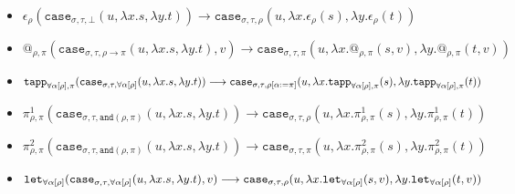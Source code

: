 \documentclass[runningheads,a4paper]{llncs}
\newcommand{\quant}[2]{\forall #1[#2]}
\newcommand{\qquant}[3]{#1 #2[#3]}
\newcommand{\red}{\longrightarrow}
\newcommand{\arrtype}{\rightarrow}
\newcommand{\abs}[2]{\lambda #1.#2}
\begin{document}
\begin{itemize}
\item $
\epsilon_\rho(\mathtt{case}_{\sigma,\tau,\bot}(u,\abs{x}{s},\abs{y}{t}))
  \red
  \mathtt{case}_{\sigma,\tau,\rho}(u,\abs{x}{\epsilon_\rho(s)},
  \abs{y}{\epsilon_\rho(t)}) $%
\item $
@_{\rho,\pi}(\mathtt{case}_{\sigma,\tau,\rho \arrtype \pi}(u,
  \abs{x}{s},\abs{y}{t}),v) %
  \red
  \mathtt{case}_{\sigma,\tau,\pi}(u,
  \abs{x}{@_{\rho,\pi}(s,v)},\abs{y}{@_{\rho,\pi}(t,v)}) $%
\item $
\mathtt{tapp}_{\quant{\alpha}{\rho},\pi}(\mathtt{case}_{\sigma,\tau,
  \quant{\alpha}{\rho}}(u,\abs{x}{s},\abs{y}{t})) %
  \red
  \mathtt{case}_{\sigma,\tau,\rho[\alpha:=\pi]}(u,
  \abs{x}{\mathtt{tapp}_{\quant{\alpha}{\rho},\pi}(s)},\\
  \abs{y}{\mathtt{tapp}_{\quant{\alpha}{\rho},\pi}(t)}) $%
\item $
\pi^1_{\rho,\pi}(\mathtt{case}_{\sigma,\tau,\mathtt{and}(\rho,\pi)}(u,
  \abs{x}{s},\abs{y}{t})) %
  \red
  \mathtt{case}_{\sigma,\tau,\rho}(u,\abs{x}{\pi^1_{\rho,\pi}(s)},
  \abs{y}{\pi^1_{\rho,\pi}(t)}) $%
\item $
\pi^2_{\rho,\pi}(\mathtt{case}_{\sigma,\tau,\mathtt{and}(\rho,\pi)}(u,
  \abs{x}{s},\abs{y}{t})) %
  \red
  \mathtt{case}_{\sigma,\tau,\pi}(u,\abs{x}{\pi^2_{\rho,\pi}(s)},
  \abs{y}{\pi^2_{\rho,\pi}(t)}) $%
\item $
\mathtt{let}_{\qquant{\forall}{\alpha}{\rho}}(
  \mathtt{case}_{\sigma,\tau,\qquant{\forall}{\alpha}{\rho}}(
  u,\abs{x}{s},\abs{y}{t}),v) %
  \red\\
  \mathtt{case}_{\sigma,\tau,\rho}(u,
  \abs{x}{\mathtt{let}_{\qquant{\forall}{\alpha}{\rho}}(s,v)},
  \abs{y}{\mathtt{let}_{\qquant{\forall}{\alpha}{\rho}}(t,v)})
  $%
\end{itemize}
\end{document}
